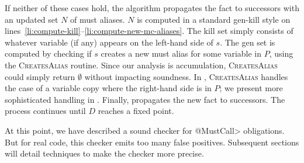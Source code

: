 If neither of these cases hold, the algorithm propagates the fact to successors
with an updated set $N$ of must aliases.  $N$ is computed in a standard gen-kill
style on lines~\ref{li:compute-kill}--\ref{li:compute-new-mc-aliases}.  The kill
set simply consists of whatever variable (if any) appears on the left-hand side
of $s$.  The gen set is computed by checking if $s$ creates a new must alias for
some variable in $P$, using the \textsc{CreatesAlias} routine.  Since our
analysis is accumulation, \textsc{CreatesAlias} could simply return $\emptyset$
without impacting soundness.  In , \textsc{CreatesAlias}
handles the case of a variable copy where the right-hand side is in $P$; we
present more sophisticated handling in . Finally,
 propagates the new fact to successors.  The process
continues until $D$ reaches a fixed point.  

At this point, we have described a sound checker for \<@MustCall> obligations.
But for real code, this checker emits too many false positives.  Subsequent
sections will detail techniques to make the checker more precise.




